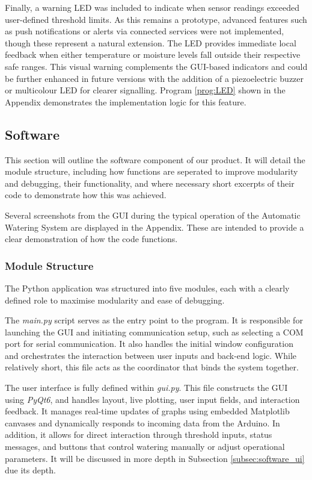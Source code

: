 \documentclass[a4paper,11pt]{article}
\begin{document}
Finally, a warning LED was included to indicate when sensor readings 
exceeded user-defined threshold limits. 
As this remains a prototype, advanced features such as push notifications 
or alerts via connected services were not implemented, 
though these represent a natural extension. 
The LED provides immediate local feedback when either temperature or moisture 
levels fall outside their respective safe ranges. 
This visual warning complements the GUI-based indicators and could be further enhanced 
in future versions with the addition of a piezoelectric buzzer 
or multicolour LED for clearer signalling. 
Program \ref{prog:LED} shown in the Appendix demonstrates 
the implementation logic for this feature.

\subsection{Software}
\label{sec:software}

This section will outline the software component of our product.
It will detail the module structure,
including how functions are seperated to improve modularity and debugging,
their functionality,
and where necessary short excerpts of their code to demonstrate how this was achieved.

Several screenshots from the GUI during the typical operation
of the Automatic Watering System are displayed in the Appendix.
These are intended to provide a clear demonstration of how the code functions.

\subsubsection{Module Structure}
\label{subsec:software_modules}
The Python application was structured into five modules, 
each with a clearly defined role to maximise modularity and ease of debugging.

The \textit{main.py} script serves as the entry point to the program. 
It is responsible for launching the GUI and initiating communication setup, 
such as selecting a COM port for serial communication. 
It also handles the initial window configuration and orchestrates the interaction 
between user inputs and back-end logic. 
While relatively short, this file acts as the coordinator that binds the system together.

The user interface is fully defined within \textit{gui.py}. 
This file constructs the GUI using \textit{PyQt6}, 
and handles layout, live plotting, user input fields, and interaction feedback. 
It manages real-time updates of graphs using embedded Matplotlib canvases 
and dynamically responds to incoming data from the Arduino. 
In addition, it allows for direct interaction through threshold inputs, 
status messages, and buttons that control watering manually or adjust operational parameters.
It will be discussed in more depth in Subsection \ref{subsec:software_ui} due its depth.
\end{document}
